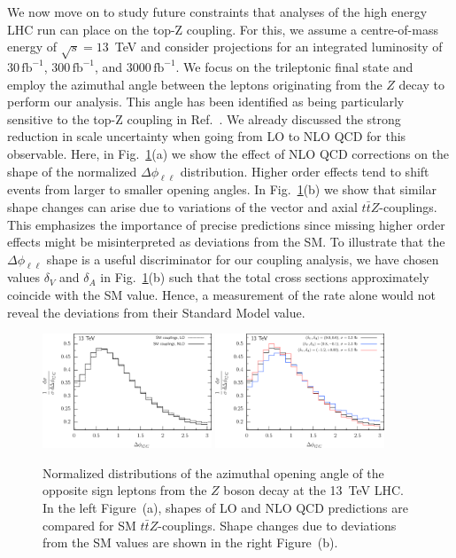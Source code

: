 \documentclass[preprint]{JHEP3} %
\def\ttbZ{t\bar{t}Z}
\def\invfb {\mathrm{fb}^{-1}}
\begin{document}
We now move on to study future constraints that analyses of the high energy LHC run can place on the top-Z coupling.
For this, we assume a centre-of-mass energy of $\sqrt{s}=13$~TeV and consider projections for an integrated luminosity of
$30\, \invfb$, $300\, \invfb$, and $3000\, \invfb$. 
We focus on the trileptonic final state and employ the azimuthal angle between the leptons originating
from the $Z$ decay to perform our analysis.
This angle has been identified as being particularly sensitive to the top-Z coupling in Ref.~\cite{Baur:2004uw}.
We already discussed the strong reduction in scale uncertainty when going from LO to NLO QCD for this observable.
Here, in Fig.~\ref{fig:v}(a) we show the effect of NLO QCD corrections on the shape of the normalized $\Delta \phi_{\ell\ell}$ distribution.
Higher order effects tend to shift events from larger to smaller opening angles.
In Fig.~\ref{fig:v}(b) we show that similar shape changes can arise due to variations of the vector and axial $\ttbZ$-couplings.
This emphasizes the importance of precise predictions since missing higher order effects might be misinterpreted as deviations from the SM.
To illustrate that the $\Delta \phi_{\ell\ell}$ shape is a useful discriminator for our coupling analysis, we have chosen 
values $\delta_V$ and $\delta_A$ in Fig.~\ref{fig:v}(b) such that the total cross sections approximately coincide with the SM value.
Hence, a measurement of the rate alone would not reveal the deviations from their Standard Model value.
 


\begin{figure}[t]
\centering %
\includegraphics[width=0.45\textwidth]{./LHC_53_Fig17a.eps}
\hfill
\includegraphics[width=0.45\textwidth]{./LHC_53_Fig17b.eps}
\caption{\label{fig:v}
Normalized distributions of the azimuthal opening angle of the opposite sign leptons from the $Z$ boson decay at the 13~TeV LHC.
In the left Figure~(a), shapes of LO and NLO QCD predictions are compared for SM $\ttbZ$-couplings.
Shape changes due to deviations from the SM values are shown in the right Figure~(b).
}
\end{figure}
\end{document}
